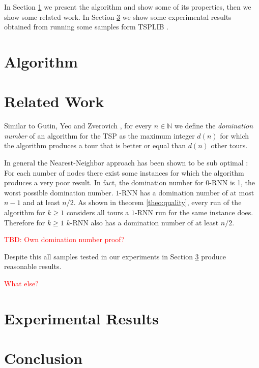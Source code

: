 \documentclass[11pt]{article}
\newcommand{\red}{\textcolor{red}}
\begin{document}
	In Section \ref{sec:algorithm} we present the algorithm and show some of its properties, then we show some related work. 
	In Section \ref{sec:experimental} we show some experimental results obtained from running some samples form TSPLIB \cite{REINELT1995}.
	
	\section{Algorithm}
	\label{sec:algorithm}
	
	
	\section{Related Work}
	\label{sec:related}
	
	Similar to Gutin, Yeo and Zverovich \cite{GUTIN2002}, for every $n \in \mathbb{N}$ we define the \textit{domination number} of an algorithm for the TSP as the maximum integer $d(n)$ for which the algorithm produces a tour that is better or equal than $d(n)$ other tours.
	 
	
	In general the Nearest-Neighbor approach has been shown to be sub optimal \cite{GUTIN2002}: 
	For each number of nodes there exist some instances for which the algorithm produces a very poor result.
	In fact, the domination number for $0$-RNN is 1, the worst possible domination number.
	$1$-RNN has a domination number of at most $n - 1$ and at least $n / 2$.
	As shown in theorem \ref{theo:quality}, every run of the algorithm for $k \geq 1$ considers all tours a $1$-RNN run for the same instance does.
	Therefore for $k \geq 1$ $k$-RNN also has a domination number of at least $n / 2$.
	
	\red{TBD: Own domination number proof?}
	
	Despite this all samples tested in our experiments in Section \ref{sec:experimental} produce reasonable results.
	
	\red{What else?}
	\section{Experimental Results}
	\label{sec:experimental}
	
	

	
	\section{Conclusion}
	\label{sec:conclusion}
	
\end{document}
